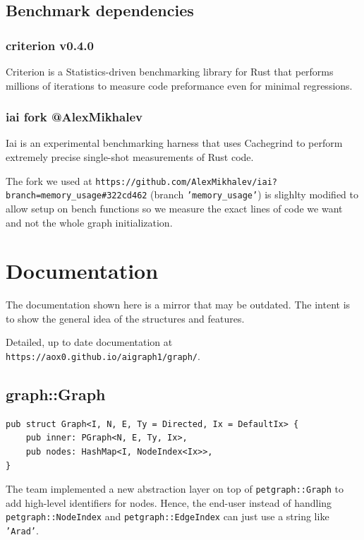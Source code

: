 \subsection{Benchmark dependencies}

\subsubsection{criterion v0.4.0}

Criterion is a Statistics-driven benchmarking library for Rust that performs millions of iterations to measure code preformance
even for minimal regressions. \autocite{criterion}
 
\subsubsection{iai fork @AlexMikhalev}

Iai is an experimental benchmarking harness that uses Cachegrind to perform extremely precise
single-shot measurements of Rust code.

The fork we used at \texttt{https://github.com/AlexMikhalev/iai?branch=memory\_usage\#322cd462} (branch \texttt{'memory\_usage'}) is slighlty
modified to allow setup on bench functions so we measure the exact lines of code we want and not the whole
graph initialization. \autocite{iai}

\newpage
\section{Documentation}

The documentation shown here is a mirror that may be outdated. 
The intent is to show the general idea of the structures and features.

Detailed, up to date documentation at \texttt{https://aox0.github.io/aigraph1/graph/}.

\subsection{graph::Graph}

\begin{verbatim}
pub struct Graph<I, N, E, Ty = Directed, Ix = DefaultIx> {
    pub inner: PGraph<N, E, Ty, Ix>,
    pub nodes: HashMap<I, NodeIndex<Ix>>,
}
\end{verbatim}

The team implemented a new abstraction layer on top of \texttt{petgraph::Graph} to add high-level identifiers for nodes.
Hence, the end-user instead of handling \texttt{petgraph::NodeIndex} and \texttt{petgraph::EdgeIndex} can just use a string like \texttt{'Arad'}.

